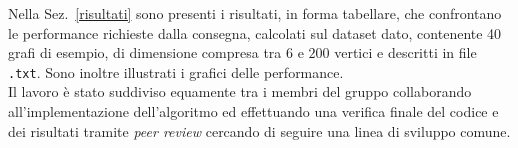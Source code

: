 Nella Sez.~\ref{risultati} sono presenti i risultati, in forma tabellare, che confrontano le performance richieste dalla consegna, calcolati sul dataset dato, contenente 40 grafi di esempio, di dimensione compresa tra $6$ e $200$ vertici e descritti in file \texttt{.txt}.
Sono inoltre illustrati i grafici delle performance.\\
Il lavoro è stato suddiviso equamente tra i membri del gruppo collaborando all'implementazione dell'algoritmo ed effettuando una verifica finale del codice e dei risultati tramite \textit{peer review} cercando di seguire una linea di sviluppo comune.
\pagebreak

